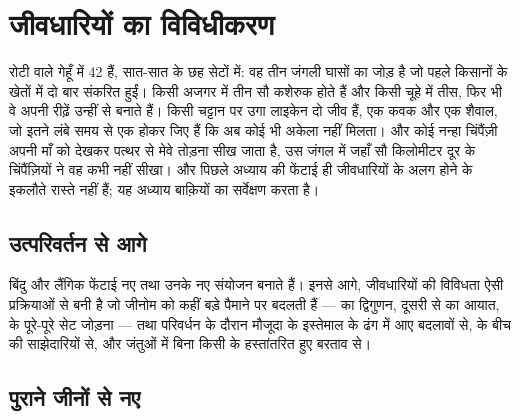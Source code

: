 \chapter{जीवधारियों का विविधीकरण}\label{ch:g12:diversification-of-life}

रोटी वाले गेहूँ में 42  हैं, सात-सात के छह सेटों में: वह तीन जंगली
घासों का जोड़ है जो पहले किसानों के खेतों में दो बार संकरित हुईं। किसी अजगर
में तीन सौ कशेरुक होते हैं और किसी चूहे में तीस, फिर भी वे अपनी रीढ़ें उन्हीं
 से बनाते हैं। किसी चट्टान पर उगा लाइकेन दो जीव हैं, एक कवक और एक
शैवाल, जो इतने लंबे समय से एक होकर जिए हैं कि अब कोई भी अकेला नहीं मिलता।
और कोई नन्हा चिंपैंज़ी अपनी माँ को देखकर पत्थर से मेवे तोड़ना सीख जाता है,
उस जंगल में जहाँ सौ किलोमीटर दूर के चिंपैंज़ियों ने वह कभी नहीं सीखा।
 और पिछले अध्याय की फेंटाई ही जीवधारियों के अलग होने के इकलौते
रास्ते नहीं हैं; यह अध्याय बाक़ियों का सर्वेक्षण करता है।

\section{उत्परिवर्तन से आगे}

\begin{proposition}[विविधीकरण के स्रोत]\label{prop:g12:diversification-of-life:sources}
बिंदु  और लैंगिक फेंटाई नए  तथा उनके नए संयोजन बनाते
हैं। इनसे आगे, जीवधारियों की विविधता ऐसी प्रक्रियाओं से बनी है जो जीनोम को
कहीं बड़े पैमाने पर बदलती हैं ---  का द्विगुणन, दूसरी  से 
का आयात,  के पूरे-पूरे सेट जोड़ना --- तथा परिवर्धन के दौरान मौजूदा
 के इस्तेमाल के ढंग में आए बदलावों से,  के बीच की साझेदारियों
से, और जंतुओं में बिना किसी  के हस्तांतरित हुए बरताव से।
\end{proposition}
\admitted

\section{पुराने जीनों से नए}

